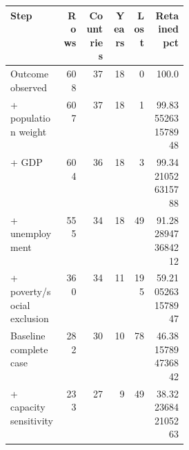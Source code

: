 \begin{tabular}{p{0.30\linewidth}rrrrr}
\toprule
Step & Rows & Countries & Years & Lost & Retained pct \\
\midrule
Outcome observed & 608 & 37 & 18 & 0 & 100.0 \\
+ population weight & 607 & 37 & 18 & 1 & 99.83552631578948 \\
+ GDP & 604 & 36 & 18 & 3 & 99.34210526315788 \\
+ unemployment & 555 & 34 & 18 & 49 & 91.28289473684212 \\
+ poverty/social exclusion & 360 & 34 & 11 & 195 & 59.21052631578947 \\
Baseline complete case & 282 & 30 & 10 & 78 & 46.38157894736842 \\
+ capacity sensitivity & 233 & 27 & 9 & 49 & 38.32236842105263 \\
\bottomrule
\end{tabular}
